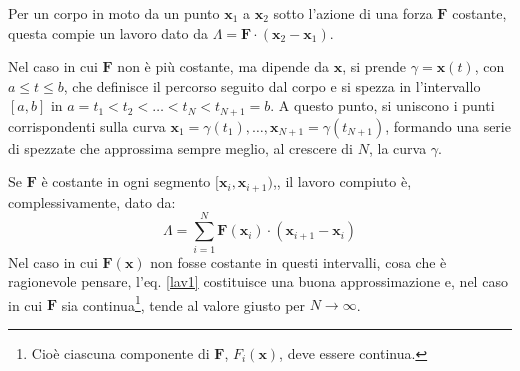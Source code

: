 \documentclass[11pt, a4paper]{scrartcl}
\theoremstyle{definition}
\numberwithin{esempio}{section}
\theoremstyle{definition}
\numberwithin{obs}{section}
\numberwithin{nota}{section}
\numberwithin{equation}{subsection}
\begin{document}
Per un corpo in moto da un punto $\mathbf{x} _1$ a $\mathbf{x} _2$ sotto l'azione di una forza $\mathbf{F} $ costante, questa compie un lavoro dato da $\Lambda = \mathbf{F} \cdot (\mathbf{x} _2 - \mathbf{x} _1)$.

Nel caso in cui $\mathbf{F} $ non \`e pi\`u costante, ma dipende da $\mathbf{x} $, si prende $\gamma = \mathbf{x} (t)$, con $a\le t\le b$, che definisce il percorso seguito dal corpo e si spezza in l'intervallo $[a,b]$ in $a = t_1 < t_2 < \ldots< t_N < t_{N+1} = b$. 
A questo punto, si uniscono i punti corrispondenti sulla curva $\mathbf{x} _1 = \gamma(t_1), \ldots, \mathbf{x} _{N+1}=\gamma(t_{N+1} ) $, formando una serie di spezzate che approssima sempre meglio, al crescere di $N$, la curva $\gamma$.

Se $\mathbf{F} $ \`e costante in ogni segmento $[\mathbf{x} _i, \mathbf{x} _{i+1} )$,, il lavoro compiuto \`e, complessivamente, dato da:
\begin{equation}\label{lav1}
	\Lambda = \sum_{i=1}^{N} \mathbf{F} (\mathbf{x} _i) \cdot (\mathbf{x} _{i+1} - \mathbf{x} _i)
\end{equation}
Nel caso in cui $\mathbf{F} (\mathbf{x} )$ non fosse costante in questi intervalli, cosa che \`e ragionevole pensare, l'eq. \ref{lav1} costituisce una buona approssimazione e, nel caso in cui $\mathbf{F} $ sia continua\footnote{Cio\`e ciascuna componente di $\mathbf{F} $, $F_i(\mathbf{x} )$, deve essere continua.}, tende al valore giusto per $N\to \infty$.
\end{document}

